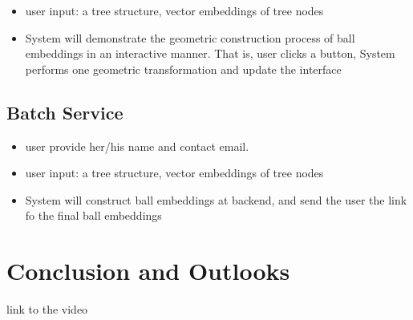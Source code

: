 \documentclass[runningheads]{llncs}
\begin{document}
\begin{itemize}
	\item user input: a tree structure, vector embeddings of tree nodes
	\item System will demonstrate the geometric construction process of ball embeddings in an interactive manner. That is, user clicks a button, System performs one geometric transformation and update the interface 
\end{itemize}

\subsection{Batch Service}

\begin{itemize}
	\item user provide her/his name and contact email.
	\item user input: a tree structure, vector embeddings of tree nodes
	\item System will construct ball embeddings at backend, and send the user the link fo the final ball embeddings  
\end{itemize}

\section{Conclusion and Outlooks}

link to the video

 
%
%
%
% 
% 
% 
\end{document}
